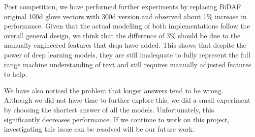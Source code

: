 \documentclass[paper=a4, fontsize=11pt]{scrartcl} %
\begin{document}
Post competition, we have performed further experiments by replacing BiDAF original 100d glove vectors with 300d version and observed about 1\% increase in performance. Given that the actual modelling of both implementations follow the overall general design, we think that the difference of 3\% should be due to the manually engineered features that drqa have added. This shows that despite the power of deep learning models, they are still inadequate to fully represent the full range machine understanding of text and still requires manually adjusted features to help.

We have also noticed the problem that longer answers tend to be wrong. Although we did not have time to further explore this, we did a small experiment by choosing the shortest answer of all the models. Unfortunately, this significantly decreases performance. If we continue to work on this project, investigating this issue can be resolved will be our future work.



 

\end{document}
